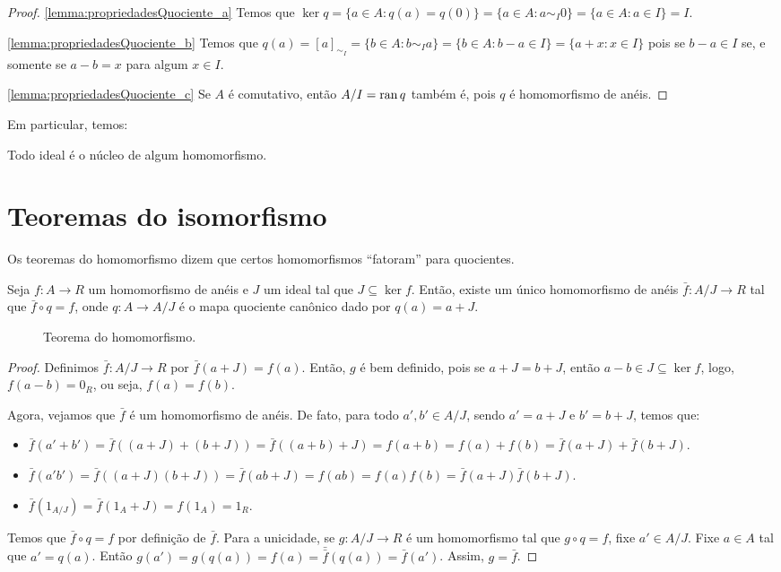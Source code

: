 \begin{proof}
    \ref{lemma:propriedadesQuociente_a} Temos que $\ker q=\{a \in A: q(a)=q(0)\}=\{a \in A: a\sim_I 0\}=\{a \in A: a\in I\}=I$.

    \ref{lemma:propriedadesQuociente_b} Temos que $q(a)=[a]_{\sim_I}=\{b \in A: b\sim_I a\}=\{b \in A: b-a\in I\}=\{a+x: x \in I\}$ pois se $b-a \in I$ se, e somente se $a-b=x$ para algum $x \in I$.

    \ref{lemma:propriedadesQuociente_c} Se $A$ é comutativo, então $A/I=\operatorname{ran} q$ também é, pois $q$ é homomorfismo de anéis.
\end{proof}

Em particular, temos:

\begin{corol}
    Todo ideal é o núcleo de algum homomorfismo.
\end{corol}

\section{Teoremas do isomorfismo}
Os teoremas do homomorfismo dizem que certos homomorfismos ``fatoram'' para quocientes.
\begin{theorem}
    Seja $f:A\rightarrow R$ um homomorfismo de anéis e $J$ um ideal tal que $J\subseteq \ker f$. Então, existe um único homomorfismo de anéis $\bar f:A/J\rightarrow R$ tal que $\bar f\circ q=f$, onde $q:A\rightarrow A/J$ é o mapa quociente canônico dado por $q(a)=a+J$.
    \begin{figure}[h]\centering
        \caption{Teorema do homomorfismo.}
    \end{figure}
\end{theorem}
\begin{proof}
    Definimos $\bar f:A/J\rightarrow R$ por $\bar f(a+J)=f(a)$. Então, $g$ é bem definido, pois se $a+J=b+J$, então $a-b \in J\subseteq \ker f$, logo, $f(a-b)=0_R$, ou seja, $f(a)=f(b)$.

    Agora, vejamos que $\bar f$ é um homomorfismo de anéis. De fato, para todo $a', b' \in A/J$, sendo $a'=a+J$ e $b'=b+J$, temos que:
    \begin{itemize}
        \item $\bar f(a'+b')=\bar f((a+J)+(b+J))=\bar f((a+b)+J)=f(a+b)=f(a)+f(b)=\bar f(a+J)+\bar f(b+J)$.
        \item $\bar f(a'b')=\bar f((a+J)(b+J))=\bar f(ab+J)=f(ab)=f(a)f(b)=\bar f(a+J)\bar f(b+J)$.
        \item $\bar f(1_{A/J})=\bar f(1_A+J)=f(1_A)=1_R$.
    \end{itemize}

    Temos que $\bar f\circ q=f$ por definição de $\bar f$. Para a unicidade, se $g:A/J\rightarrow R$ é um homomorfismo tal que $g\circ q=f$, fixe $a'\in A/J$. Fixe $a \in A$ tal que $a'=q(a)$. Então $g(a')=g(q(a))=f(a)=\bar \bar f(q(a))=\bar f(a')$. Assim, $g=\bar f$.
\end{proof}